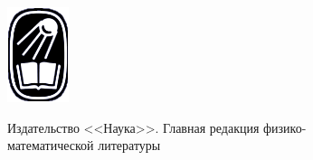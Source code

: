 \documentclass[10dd, a5paper]{article}
\begin{document}
\begin{minipage}[t][][t]{0.45\linewidth}
\vspace{0.3cm}
\begin{minipage}[l]{0.1\linewidth}
\includegraphics[width=\linewidth]{nauka}
\end{minipage}%
\hspace{3dd}%
\begin{minipage}[с]{0.87\linewidth}
\fontsize{8dd}{6dd}\selectfont
\raggedright
Издательство <<Наука>>. Главная редакция физико-\\математической литературы
\end{minipage}
\end{minipage}%
\end{document}
